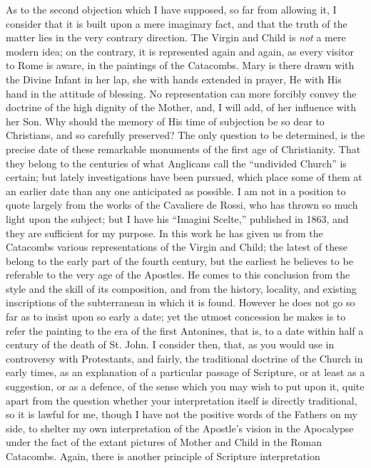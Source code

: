 As to the second objection which I have supposed, so far from
allowing it, I consider that it is built upon a mere imaginary fact, and
that the truth of the matter lies in the very contrary direction. The
Virgin and Child is \emph{not} a mere modern idea; on the contrary, it is
represented again and again, as every visitor to Rome is aware, in the
paintings of the Catacombs. Mary is there drawn with the Divine Infant
in her lap, she with hands extended in prayer, He with His hand in the
attitude of blessing. No representation can more forcibly convey the
doctrine of the high dignity of the Mother, and, I will add, of her
influence with her Son. Why should the memory of His time of subjection
be so dear to Christians, and so carefully preserved? The only question
to be determined, is the precise date of these remarkable monuments of
the first age of Christianity. That they belong to the centuries of what
Anglicans call the ``undivided Church'' is certain; but lately
investigations have been pursued, which place some of them at an earlier
date than any one anticipated as possible. I am not in a position
to quote largely from the works of the Cavaliere de Rossi, who has
thrown so much light upon the subject; but I have his ``Imagini
Scelte,'' published in 1863, and they are sufficient for my purpose.
In this work he has given us from the Catacombs various representations
of the Virgin and Child; the latest of these belong to the early part of
the fourth century, but the earliest he believes to be referable to the
very age of the Apostles. He comes to this conclusion from the style and
the skill of its composition, and from the history, locality, and
existing inscriptions of the subterranean in which it is found. However
he does not go so far as to insist upon so early a date; yet the utmost
concession he makes is to refer the painting to the era of the first
Antonines, that is, to a date within half a century of the death of St.
John. I consider then, that, as you would use in controversy with
Protestants, and fairly, the traditional doctrine of the Church in early
times, as an explanation of a particular passage of Scripture, or at
least as a suggestion, or as a defence, of the sense which you may wish
to put upon it, quite apart from the question whether your
interpretation itself is directly traditional, so it is lawful for me,
though I have not the positive words of the Fathers on my side, to
shelter my own interpretation of the Apostle's vision in the Apocalypse
under the fact of the extant pictures of Mother and Child in the Roman
Catacombs. Again, there is another principle of Scripture interpretation
